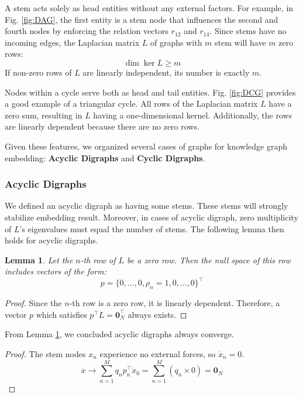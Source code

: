 \documentclass[letterpaper, 10 pt, conference]{ieeeconf}  %
\newtheorem{lemma}[theorem]{Lemma}
\begin{document}
A stem acts solely as head entities without any external factors. For example, in Fig. \ref{fig:DAG}, the first entity is a stem node that influences the second and fourth nodes by enforcing the relation vectors \( r_{12} \) and \( r_{14} \). Since stems have no incoming edges, the Laplacian matrix \( L \) of graphs with \( m \) stem will have \( m \) zero rows:
\[
    \dim \ker L \geq m
\]
If non-zero rows of \(L\) are linearly independent, its number is exactly \(m\). 

Nodes within a cycle serve both as head and tail entities. Fig. \ref{fig:DCG} provides a good example of a triangular cycle. All rows of the Laplacian matrix \( L \) have a zero sum, resulting in \( L \) having a one-dimensional kernel. Additionally, the rows are linearly dependent because there are no zero rows.


Given these features, we organized several cases of graphs for knowledge graph embedding: \textbf{Acyclic Digraphs} and \textbf{Cyclic Digraphs}.

\subsubsection{Acyclic Digraphs}

We defined an acyclic digraph as having some stems. These stems will strongly stabilize embedding result. Moreover, in cases of acyclic digraph, zero multiplicity of \(L\)'s eigenvalues must equal the number of stems. The following lemma then holds for acyclic digraphs.

\begin{lemma}\label{lemma:p}
Let the \( n \)-th row of \( L \) be a zero row. Then the null space of this row includes vectors of the form:
\begin{equation}\label{eq:DAG_left}
    p = \{0, \dots, 0, \rho_n = 1, 0, \dots, 0\}^\top
\end{equation}
\end{lemma}

\begin{proof}
Since the \( n \)-th row is a zero row, it is linearly dependent. Therefore, a vector \( p \) which satisfies \( p^\top L = \mathbf{0}_N^\top \) always exists.
\end{proof}

From Lemma \ref{lemma:p}, we concluded acyclic digraphs always converge.

\begin{proof}
The stem nodes \( x_n \) experience no external forces, so \( \dot{x}_n = 0 \). 
\begin{equation}\label{eq:0_N}
    \dot{x} \rightarrow \sum_{n=1}^M q_n p_n^\top \dot{x}_0 = \sum_{n=1}^M (q_n \times 0) = \mathbf{0}_N
\end{equation}
\end{proof}
\end{document}
